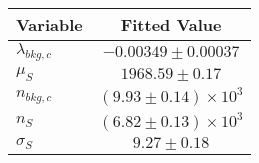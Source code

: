 \begin{tabular}[t]{lc}
\hline
Variable &Fitted Value\\
\hline\hline
$\lambda_{bkg,c}$&$-0.00349\pm0.00037$\\
\hline
$\mu_{S}$&$1968.59\pm0.17$\\
\hline
$n_{bkg,c}$&$(9.93\pm0.14)\times 10^3$\\
\hline
$n_{S}$&$(6.82\pm0.13)\times 10^3$\\
\hline
$\sigma_{S}$&$9.27\pm0.18$\\
\hline
\end{tabular}